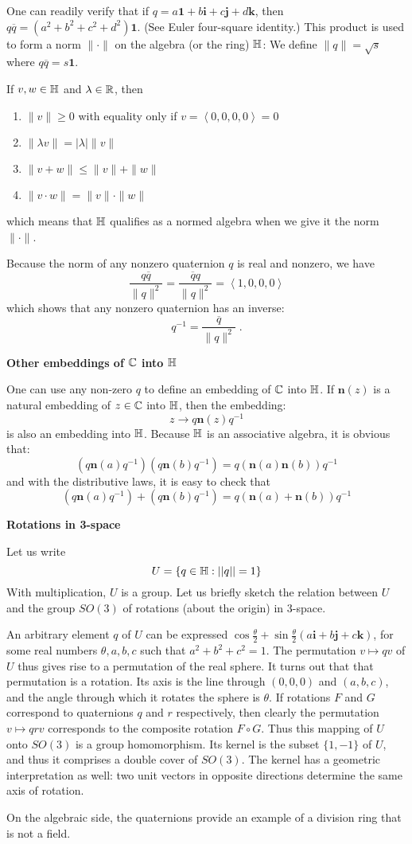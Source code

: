 \documentclass[12pt]{article}
\begin{document}
One can readily verify that if
$q = a\mathbf{1} + b\mathbf{i} + c\mathbf{j} + d\mathbf{k}$,
then $q\overline{q} = (a^2 + b^2 + c^2 + d^2)\mathbf{1}$.
(See Euler four-square identity.)
This product is used to form a norm $\|\cdot\|$ on the algebra
(or the ring) $\mathbb{H}$: We define $\|q\| = \sqrt{s}$ where
$q\overline{q} = s\mathbf{1}$.

If $v,w \in \mathbb{H}$ and $\lambda \in \mathbb{R}$, then
\begin{enumerate}
\item $\|v\| \geq 0$ with equality only if $v = \left<0,0,0,0\right> = 0$
\item $\|\lambda v\| = |\lambda| \|v\|$
\item $\|v+w\| \leq \|v\| + \|w\|$
\item $\|v \cdot w\| = \|v\| \cdot \|w\|$
\end{enumerate}
which means that $\mathbb{H}$ qualifies as a normed algebra when we give it the
norm $\|\cdot\|$.

Because the norm of any nonzero quaternion $q$ is real and nonzero,
we have
$$ \frac{q\overline{q}}{\|q\|^2}
= \frac{\overline{q}q}{\|q\|^2}
= \left< 1, 0, 0, 0 \right> $$
which shows that any nonzero quaternion has an inverse:
$$q^{-1} = \frac{\overline{q}}{\|q\|^2}\;.$$

\noindent
\textbf{Other embeddings of $\mathbb{C}$ into $\mathbb{H}$}

One can use any non-zero $q$ to define an embedding of
$\mathbb{C}$ into $\mathbb{H}$.  If $\mathbf{n}(z)$
is a natural embedding of $z \in \mathbb{C}$
into $\mathbb{H}$, then the embedding:
$$ z \rightarrow q \mathbf{n}(z) q^{-1} $$
is also an embedding into $\mathbb{H}$.
Because $\mathbb{H}$ is an associative algebra, it is obvious
that:
$$ ( q \mathbf{n}(a) q^{-1} )( q \mathbf{n}(b) q^{-1} ) =
q ( \mathbf{n}(a) \mathbf{n}(b) ) q^{-1} $$
and with the distributive laws, it is easy to check that
$$ ( q \mathbf{n}(a) q^{-1} ) + ( q \mathbf{n}(b) q^{-1} ) =
q ( \mathbf{n}(a) + \mathbf{n}(b) ) q^{-1} $$

\noindent
\textbf{Rotations in 3-space}

Let us write
$$U=\{q\in\mathbb{H}:||q||=1\}$$
With multiplication, $U$ is a group.
Let us briefly sketch the relation between $U$ and the group
$SO(3)$ of rotations (about the origin) in 3-space.

An arbitrary element $q$ of $U$ can be expressed
$\cos\frac{\theta}{2} + \sin\frac{\theta}{2}
(a\mathbf{i} + b\mathbf{j} + c\mathbf{k})$,
for some real numbers $\theta,a,b,c$ such that $a^2+b^2+c^2=1$.
The permutation $v\mapsto qv$ of $U$ thus gives rise to a permutation
of the real sphere. It turns out that that permutation is a rotation.
Its axis is the line through $(0,0,0)$ and $(a,b,c)$, and the angle
through which it rotates the sphere is $\theta$.
If rotations $F$ and $G$ correspond to quaternions $q$ and $r$
respectively, then clearly the permutation $v\mapsto qrv$ corresponds
to the composite rotation $F\circ G$.
Thus this mapping of $U$ onto $SO(3)$ is a group homomorphism.
Its kernel is the subset $\{1,-1\}$ of $U$, and thus it comprises
a double cover of $SO(3)$. The kernel has a geometric interpretation
as well: two unit vectors in opposite directions determine the same
axis of rotation.

On the algebraic side, the quaternions provide an example of a division ring that is not a field.
\end{document}
